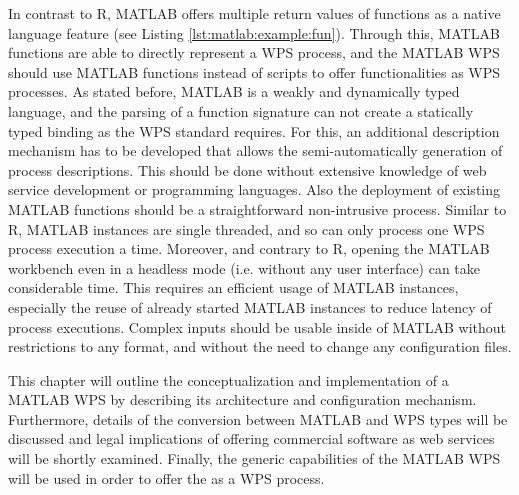 	In contrast to R, MATLAB offers multiple return values of functions as a native language feature (see Listing \ref{lst:matlab:example:fun}). Through this, MATLAB functions are able to directly represent a \ac{WPS} process, and the MATLAB WPS should use MATLAB functions instead of scripts to offer functionalities as WPS processes. As stated before, MATLAB is a weakly and dynamically typed language, and the parsing of a function signature can not create a statically typed binding as the \ac{WPS} standard requires. For this, an additional description mechanism has to be developed that allows the semi-automatically generation of process descriptions. This should be done without extensive knowledge of web service development or programming languages. Also the deployment of existing MATLAB functions should be a straightforward non-intrusive process. Similar to R, MATLAB instances are single threaded, and so can only process one WPS process execution a time. Moreover, and contrary to R, opening the MATLAB workbench even in a headless mode (i.e. without any user interface) can take considerable time. This requires an efficient usage of MATLAB instances, especially the reuse of already started MATLAB instances to reduce latency of process executions. Complex inputs should be usable inside of MATLAB without restrictions to any format, and without the need to change any configuration files.

	

  	This chapter will outline the conceptualization and implementation of a MATLAB WPS by describing its architecture and configuration mechanism. Furthermore, details of the conversion between MATLAB and WPS types will be discussed and legal implications of offering commercial software as web services will be shortly examined. Finally, the generic capabilities of the MATLAB WPS will be used in order to offer the \la as a WPS process.

